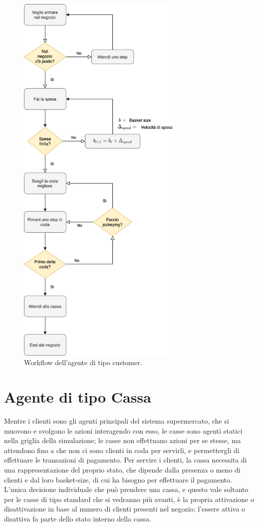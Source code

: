 \begin{figure}[H]
	\centering
	\includegraphics[width=8cm]{"images/workflow_customer.png"}
	\caption{Workflow dell'agente di tipo customer.}
	\label{fig:workflow_customer}
\end{figure}

\section{Agente di tipo Cassa}
\label{model:cashdesks}

Mentre i clienti sono gli agenti principali del sistema supermercato, che si muovono e svolgono le azioni interagendo con esso, le casse sono agenti statici nella griglia della simulazione; le casse non effettuano azioni per se stesse, ma attendono fino a che non ci sono clienti in coda per servirli, e permettergli di effettuare le transazioni di pagamento. Per servire i clienti, la cassa necessita di una rappresentazione del proprio stato, che dipende dalla presenza o meno di clienti e dal loro basket-size, di cui ha bisogno per effettuare il pagamento. L'unica decisione individuale che può prendere una cassa, e questo vale soltanto per le casse di tipo standard che si vedranno più avanti, è la propria attivazione o disattivazione in base al numero di clienti presenti nel negozio; l'essere attiva o disattiva fa parte dello stato interno della cassa.

